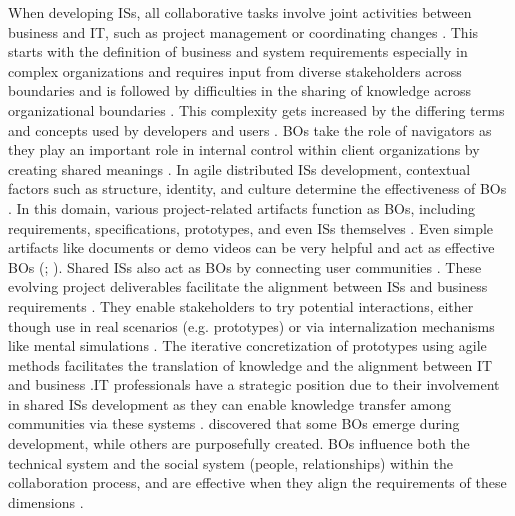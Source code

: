 \documentclass[12pt,oneside]{article}
\begin{document}
When developing \ac{IS}s, all collaborative tasks involve joint activities between business and \ac{IT}, such as project management or coordinating changes \citep[7]{jentsch2014shared}. This starts with the definition of business and system requirements especially in complex organizations and requires input from diverse stakeholders across boundaries and is followed by difficulties in the sharing of knowledge across organizational boundaries \citep[1]{gasson2005resolving}. This complexity gets increased by the differing terms and concepts used by developers and users \citep[8]{jentsch2014shared}. \ac{BO}s take the role of navigators as they play an important role in internal control within client organizations by creating shared meanings \citep[3-4]{gantman2011boundary}. In agile distributed \ac{IS}s development, contextual factors such as structure, identity, and culture determine the effectiveness of \ac{BO}s \citep[518]{mccarthy2020building}. \newline
In this domain, various project-related artifacts function as \ac{BO}s, including requirements, specifications, prototypes, and even \ac{IS}s themselves \citep[5118]{weeger2017artefacts}. Even simple artifacts like documents or demo videos can be very helpful and act as effective \ac{BO}s (\citealp[7]{gantman2011boundary}; \citealp[8]{bakhaev2023cocreating}). 
Shared \ac{IS}s also act as \ac{BO}s by connecting user communities \citep[336]{pawlowski2000supporting}. These evolving project deliverables facilitate the alignment between \ac{IS}s and business requirements \citep[5120]{weeger2017artefacts}. They enable stakeholders to try potential interactions, either though use in real scenarios (e.g. prototypes) or via internalization mechanisms like mental simulations \citep[5120]{weeger2017artefacts}. The iterative concretization of prototypes using agile methods facilitates the translation of knowledge and the alignment between \ac{IT} and business \citep[5121]{weeger2017artefacts}.\ac{IT} professionals have a strategic position due to their involvement in shared \ac{IS}s development as they can enable knowledge transfer among communities via these systems \citep[336]{pawlowski2000supporting}. \citet[584]{doolin2012sociomateriality} discovered that some \ac{BO}s emerge during development, while others are purposefully created. \ac{BO}s influence both the technical system and the social system (people, relationships) within the collaboration process, and are effective when they align the requirements of these dimensions \citep[4-5]{marheineke2016importance}.
\end{document}

